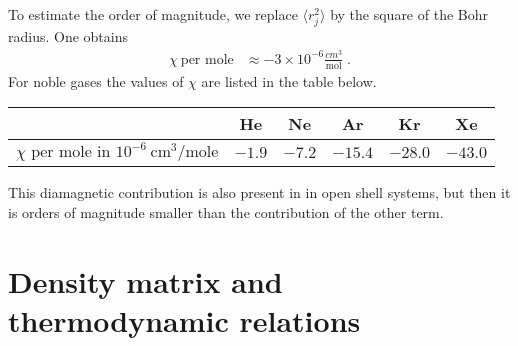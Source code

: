 To estimate the order of magnitude, we replace $\langle r_{j}^{2}\rangle$ by the square of the Bohr radius.
One obtains 
%
\begin{align*}
\chi ~ \text{per mole} &\approx - 3 \times 10^{-6}\frac{cm^{3}}{\text{mol}}\;.
\end{align*}
%
For noble gases the values of $\chi$ are listed in the table below. 
\begin{table}
\begin{tabular}{l|ccccc}
  \hline
  & He& Ne&Ar&Kr&Xe\\
  \hline
$\chi \text{ per mole in } 10^{-6} ~ \text{cm}^{3}/\text{mole}$& $-1.9$&$-7.2$&$-15.4$&$-28.0$&$-43.0$ \\
  \hline
\end{tabular}
\end{table}
% 
This diamagnetic contribution is also present in in open shell systems, but then it is orders of magnitude smaller than the contribution of the other term.
\section{Density matrix and thermodynamic relations}

